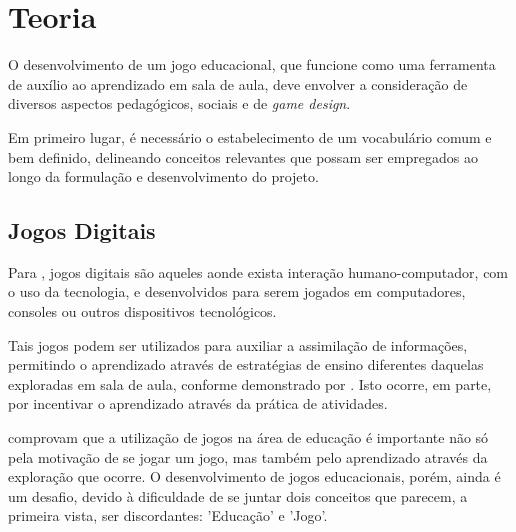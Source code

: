 
\chapter{Teoria}\label{cap-teoria}

O desenvolvimento de um jogo educacional, que funcione como uma ferramenta de auxílio ao
aprendizado em sala de aula, deve envolver a consideração de diversos aspectos
pedagógicos, sociais e de \textit{game design}.

Em primeiro lugar, é necessário o estabelecimento de um vocabulário comum e bem
definido, delineando conceitos relevantes que possam ser empregados ao longo da 
formulação e desenvolvimento do projeto.

\section{Jogos Digitais}\label{sec-jogosdigitais}


Para \cite{correia:2009:digital_games_spore}, jogos digitais são aqueles aonde exista
interação humano-computador, com o uso da tecnologia, e desenvolvidos para serem 
jogados em computadores, consoles ou outros dispositivos tecnológicos.

Tais jogos podem ser utilizados para auxiliar a assimilação de informações, permitindo
o aprendizado através de estratégias de ensino diferentes daquelas exploradas em sala
de aula, conforme demonstrado por \cite{fernandes:2012:digital_education}. Isto 
ocorre, em parte, por incentivar o aprendizado através da prática de atividades.

\cite{correia:2009:digital_games_spore} comprovam que a utilização de jogos 
na área de educação é importante não só pela motivação de se jogar um jogo, 
mas também pelo aprendizado através da exploração que ocorre. O 
desenvolvimento de jogos educacionais, porém, ainda é um desafio, devido 
à dificuldade de se juntar dois conceitos que parecem, a primeira vista,
ser discordantes: 'Educação' e 'Jogo'.

